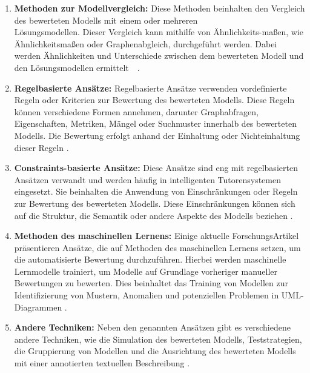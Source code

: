 \begin{enumerate}
    \item \textbf{Methoden zur Modellvergleich:}  Diese Methoden beinhalten den Vergleich des bewerteten Modells mit
    einem oder mehreren \\ Lösungsmodellen. Dieser Vergleich kann mithilfe von Ähnlichkeits-maßen, wie
    Ähnlichkeitsmaßen oder Graphenabgleich, durchgeführt werden. Dabei werden Ähnlichkeiten und Unterschiede zwischen dem bewerteten
    Modell und den Lösungsmodellen ermittelt~\cite{ullrich2021automated}~\cite{fauzan2021different}.

    \item \textbf{Regelbasierte Ansätze:} Regelbasierte Ansätze verwenden vordefinierte Regeln oder Kriterien zur Bewertung des bewerteten Modells. Diese Regeln können verschiedene Formen annehmen, darunter Graphabfragen, Eigenschaften, Metriken, Mängel oder Suchmuster innerhalb des bewerteten Modells. Die Bewertung erfolgt anhand der Einhaltung oder Nichteinhaltung dieser Regeln \cite{ullrich2021automated} \cite{striewe2011automated}.

    \item \textbf{Constraints-basierte Ansätze:} Diese Ansätze sind eng mit regelbasierten Ansätzen verwandt und werden häufig in intelligenten Tutorensystemen eingesetzt. Sie beinhalten die Anwendung von Einschränkungen oder Regeln zur Bewertung des bewerteten Modells. Diese Einschränkungen können sich auf die Struktur, die Semantik oder andere Aspekte des Modells beziehen \cite{ullrich2021automated} \cite{holland2011effects}.

    \item \textbf{Methoden des maschinellen Lernens:}  Einige aktuelle ForschungsArtikel präsentieren Ansätze, die auf Methoden des maschinellen Lernens setzen, um die automatisierte Bewertung durchzuführen. Hierbei werden maschinelle Lernmodelle trainiert, um Modelle auf Grundlage vorheriger manueller Bewertungen zu bewerten. Dies beinhaltet das Training von Modellen zur Identifizierung von Mustern, Anomalien und potenziellen Problemen in UML-Diagrammen \cite{ullrich2021automated} \cite{boubekeur2020automatic} \cite{ml}.

    \item \textbf{Andere Techniken:}  Neben den genannten Ansätzen gibt es verschiedene andere Techniken, wie die Simulation des bewerteten Modells, Teststrategien, die Gruppierung von Modellen und die Ausrichtung des bewerteten Modells mit einer annotierten textuellen Beschreibung \cite{ullrich2021automated} .


\end{enumerate}
